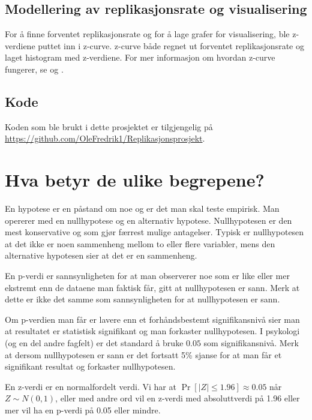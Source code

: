 \documentclass[doc,norsk]{apa7}
\begin{document}
\subsection{Modellering av replikasjonsrate og visualisering}
For å finne forventet replikasjonsrate og for å lage grafer for visualisering, ble z-verdiene puttet inn i z-curve. z-curve både regnet ut forventet replikasjonsrate og laget histogram med z-verdiene. For mer informasjon om hvordan z-curve fungerer, se \textcite{z-curve-modell} og \textcite{z-curve-implementasjon}. 

\subsection{Kode}
Koden som ble brukt i dette prosjektet er tilgjengelig på \url{https://github.com/OleFredrik1/Replikasjonsprosjekt}.

\section{Hva betyr de ulike begrepene?}
En hypotese er en påstand om noe og er det man skal teste empirisk. Man opererer med en nullhypotese og en alternativ hypotese. Nullhypotesen er den mest konservative og som gjør færrest mulige antagelser. Typisk er nullhypotesen at det ikke er noen sammenheng mellom to eller flere variabler, mens den alternative hypotesen sier at det er en sammenheng.

En p-verdi er sannsynligheten for at man observerer noe som er like eller mer ekstremt enn de dataene man faktisk får, gitt at nullhypotesen er sann. Merk at dette er ikke det samme som sannsynligheten for at nullhypotesen er sann.

Om p-verdien man får er lavere enn et forhåndsbestemt signifikansnivå sier man at resultatet er statistisk signifikant og man forkaster nullhypotesen. I psykologi (og en del andre fagfelt) er det standard å bruke $0.05$ som signifikansnivå. Merk at dersom nullhypotesen er sann er det fortsatt 5\% sjanse for at man får et signifikant resultat og forkaster nullhypotesen.

En z-verdi er en normalfordelt verdi. Vi har at $\Pr[|Z| \leq 1.96] \approx 0.05$ når $Z \sim N(0, 1)$, eller med andre ord vil en z-verdi med absoluttverdi på 1.96 eller mer vil ha en p-verdi på 0.05 eller mindre.
\end{document}
